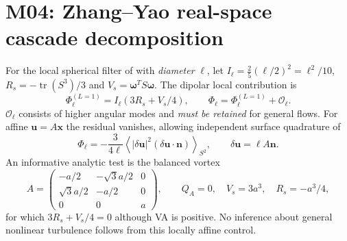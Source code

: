 \documentclass[10pt,a4paper]{article}
\begin{document}
\section{M04: Zhang--Yao real-space cascade decomposition}
For the local spherical filter of \cite{ZhangYao2026} with \emph{diameter} $\ell$, let $I_\ell=\frac25(\ell/2)^2=\ell^2/10$, $R_s=-\operatorname{tr}(S^3)/3$ and $V_s=\boldsymbol\omega^TS\boldsymbol\omega$. The dipolar local contribution is
\begin{equation}
 \Phi_\ell^{(L=1)}=I_\ell(3R_s+V_s/4),\qquad
 \Phi_\ell=\Phi_\ell^{(L=1)}+\mathcal O_\ell.
\end{equation}
$\mathcal O_\ell$ consists of higher angular modes and \emph{must be retained} for general flows. For affine $\mathbf u=A\mathbf x$ the residual vanishes, allowing independent surface quadrature of
\begin{equation}
 \Phi_\ell=-\frac{3}{4\ell}\left\langle|\delta\mathbf u|^2(\delta\mathbf u\cdot\mathbf n)\right\rangle_{S^2},\qquad \delta\mathbf u=\ell A\mathbf n.
\end{equation}
An informative analytic test is the balanced vortex
\begin{equation}
 A=\begin{pmatrix}-a/2&-\sqrt3a/2&0\\\sqrt3a/2&-a/2&0\\0&0&a\end{pmatrix},\qquad Q_A=0,\quad V_s=3a^3,\quad R_s=-a^3/4,
\end{equation}
for which $3R_s+V_s/4=0$ although VA is positive. No inference about general nonlinear turbulence follows from this locally affine control.
\end{document}

